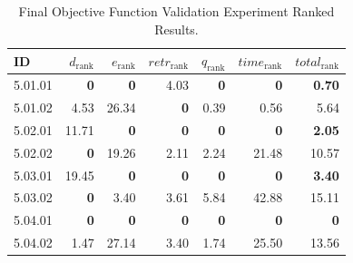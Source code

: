 \begin{table}[ht]
\centering
\footnotesize
\caption{Final Objective Function Validation Experiment Ranked Results.}
\label{tab:final_validation_ranked}
\begin{tabular}{@{}lrrrrrr@{}}
\hline
    ID & $d_{\text{rank}}$ & $e_{\text{rank}}$ & $retr_{\text{rank}}$ & $q_{\text{rank}}$ & $time_{\text{rank}}$ & $total_{\text{rank}}$ \\
\hline
    5.01.01 & \textbf{0} & \textbf{0} & 4.03 & \textbf{0} & \textbf{0} & \textbf{0.70} \\
    5.01.02 & 4.53 & 26.34 & \textbf{0} & 0.39 & 0.56 & 5.64 \\
    \noalign{\smallskip}
    5.02.01 & 11.71 & \textbf{0} & \textbf{0} & \textbf{0} & \textbf{0} & \textbf{2.05} \\
    5.02.02 & \textbf{0} & 19.26 & 2.11 & 2.24 & 21.48 & 10.57 \\
    \noalign{\smallskip}
    5.03.01 & 19.45 & \textbf{0} & \textbf{0} & \textbf{0} & \textbf{0} & \textbf{3.40} \\
    5.03.02 & \textbf{0} & 3.40 & 3.61 & 5.84 & 42.88 & 15.11 \\
    \noalign{\smallskip}
    5.04.01 & \textbf{0} & \textbf{0} & \textbf{0} & \textbf{0} & \textbf{0} & \textbf{0} \\
    5.04.02 & 1.47 & 27.14 & 3.40 & 1.74 & 25.50 & 13.56 \\
\hline
\end{tabular}
\end{table}